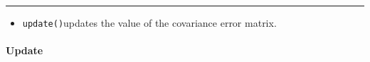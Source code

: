 \begin{Shaded}
\begin{Highlighting}[]
\OperatorTok{(*}\OperatorTok{)} \OperatorTok{=} \OperatorTok{(*}\OperatorTok{)} \OperatorTok{+} \OperatorTok{(*}\OperatorTok{)} \OperatorTok{*} \OperatorTok{((*}\OperatorTok{)} \OperatorTok{{-}} \OperatorTok{(*}\OperatorTok{)} \OperatorTok{*} \OperatorTok{(*}\OperatorTok{));}
\OperatorTok{{-}\textgreater{}}\OperatorTok{=}\OperatorTok{{-}\textgreater{}}\OperatorTok{()[}\OperatorTok{][}\OperatorTok{];}
\OperatorTok{{-}\textgreater{}}\OperatorTok{=}\OperatorTok{{-}\textgreater{}}\OperatorTok{()[}\OperatorTok{][}\OperatorTok{];}
\OperatorTok{{-}\textgreater{}}\OperatorTok{=}\OperatorTok{{-}\textgreater{}}\OperatorTok{()[}\OperatorTok{][}\OperatorTok{];}
\end{Highlighting}
\end{Shaded}

\begin{center}\rule{0.5\linewidth}{0.5pt}\end{center}

\begin{itemize}
\tightlist
\item
  \texttt{update()}updates the value of the covariance error matrix.
\end{itemize}

\hypertarget{update}{%
\paragraph{Update}\label{update}}

\begin{Shaded}
\begin{Highlighting}[]
\OperatorTok{*}\OperatorTok{=} \OperatorTok{(}\OperatorTok{{-}\textgreater{}}\OperatorTok{);}
\OperatorTok{(*}\OperatorTok{)} \OperatorTok{=} \OperatorTok{((*}\OperatorTok{)} \OperatorTok{{-}} \OperatorTok{(*}\OperatorTok{)} \OperatorTok{*} \OperatorTok{(*}\OperatorTok{))} \OperatorTok{*} \OperatorTok{(*}\OperatorTok{);}
\end{Highlighting}
\end{Shaded}

